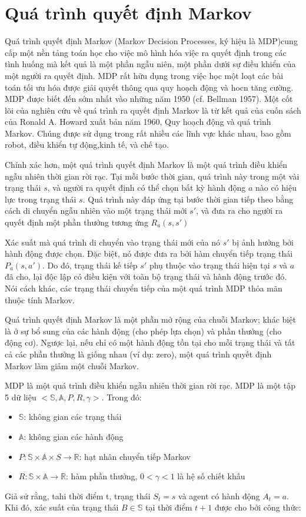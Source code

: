\documentclass[14pt]{extreport}
\begin{document}
 
\section{Quá trình quyết định Markov}

 Quá trình quyết định Markov (Markov Decision Processes, ký hiệu là MDP)cung cấp một nền tảng toán học cho việc mô hình hóa việc ra quyết định trong các tình huống mà kết quả là một phần ngẫu niên, một phần dưới sự điều khiển của một người ra quyết định. MDP rất hữu dụng trong việc học một loạt các bài toán tối ưu hóa được giải quyết thông qua quy hoạch động và hocn tăng cường. MDP được biết đến sớm nhất vào những năm 1950 (cf. Bellman 1957).  Một cốt lõi của nghiên cứu về quá trình ra quyết định Markov là từ kết quả của cuốn sách của Ronald A. Howard xuất bản năm 1960, Quy hoạch động và quá trình Markov. Chúng được sử dụng trong rất nhiều các lĩnh vực khác nhau, bao gồm robot, điều khiển tự động,kinh tế, và chế tạo.
 
 Chính xác hơn, một quá trình quyết định Markov là một quá trình điều khiển ngẫu nhiên thời gian rời rạc. Tại mỗi bước thời gian, quá trình này trong một vài trạng thái $s$, và người ra quyết định có thể chọn bất kỳ hành động $a$ nào có hiệu lực trong trạng thái $s$. Quá trình này đáp ứng tại bước thời gian tiếp theo bằng cách di chuyển ngẫu nhiên vào một trạng thái mới $s'$, và đưa ra cho người ra quyết định một phần thưởng tương ứng $R_a (s,s')$
 
 Xác suất mà quá trình di chuyển vào trạng thái mới của nó $s'$ bị ảnh hưởng bởi hành động được chọn. Đặc biệt, nó được đưa ra bởi hàm chuyển tiếp trạng thái $P_a (s,a')$. Do đó, trạng thái kế tiếp $s'$ phụ thuộc vào trạng thái hiện tại $s$ và $a$ đã cho, lại độc lập có điều kiện với toàn bộ trạng thái và hành động trước đó. Nói cách khác, các trạng thái chuyển tiếp của một quá trình MDP thỏa mãn thuộc tính Markov.
 
 Quá trình quyết định Markov là một phần mở rộng của chuỗi Markov; khác biệt là ở sự bổ sung của các hành động (cho phép lựa chọn) và phần thưởng (cho động cơ). Ngược lại, nếu chỉ có một hành động tồn tại cho mỗi trạng thái và tất cả các phần thưởng là giống nhau (ví dụ: zero), một quá trình quyết định Markov làm giảm một chuỗi Markov.

MDP là một quá trình điều khiển ngẫu nhiên thời gian rời rạc. MDP là một tập 5 dữ liệu $<\mathbb{S},\mathbb{A},P,R,\gamma>$. Trong đó:

\begin{itemize}
 \item  $\mathbb{S}$: không gian các trạng thái
 \item $\mathbb{A}$: không gian các hành động
 \item  $P: \mathbb{S} \times\mathbb{A} \times S\rightarrow \mathbb{R}$: hạt nhân chuyển tiếp Markov
 \item $R: \mathbb{S} \times \mathbb{A}\rightarrow \mathbb{R}$: hàm phần thưởng, $0<\gamma<1$ là hệ số chiết khấu
\end{itemize}
 Giả sử rằng, tahi thời điểm t, trạng thái $S_t=s$ và agent có hành động $A_t=a$. Khi đó, xác suất của trạng thái $B \in \mathbb{S}$ tại thời điểm $t+1$ được cho bởi công thức:
 
\end{document}
